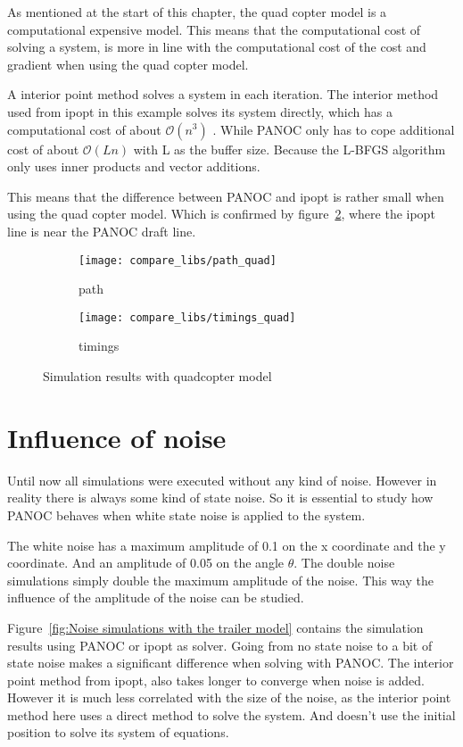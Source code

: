 As mentioned at the start of this chapter, the quad copter model is a computational expensive model. This means that the computational cost of solving a system, is more in line with the computational cost of the cost and gradient when using the quad copter model.

A interior point method solves a system in each iteration. The interior method used from ipopt in this example solves its system directly, which has a computational cost of about $\mathcal{O}(n^3)$ . While PANOC only has to cope additional cost of about $\mathcal{O}(Ln)$ with L as the buffer size.  Because the L-BFGS algorithm only uses inner products and vector additions.

This means that the difference between PANOC and ipopt is rather small when using the quad copter model. Which is confirmed by figure~\ref{fig:timings trailer quad}, where the ipopt line is near the PANOC draft line.
\begin{figure}[H]
	\centering
	\begin{subfigure}[b]{0.45\textwidth}
		\centering
		\texttt{[image: compare\_libs/path\_quad]}
		\caption{path}
		\label{fig:solution path trailer quad}
	\end{subfigure}
	\hfill
	\begin{subfigure}[b]{0.45\textwidth}
		\centering
		\texttt{[image: compare\_libs/timings\_quad]}
		\caption{timings}
		\label{fig:timings trailer quad}
	\end{subfigure}
	\caption{Simulation results with quadcopter model}
	\label{fig:Simulation results with quadcopter}
\end{figure}

\section{Influence of noise}
Until now all simulations were executed without any kind of noise. However in reality there is always some kind of state noise. So it is essential to study how PANOC behaves when white state noise is applied to the system.

The white noise has a maximum amplitude of 0.1 on the x coordinate and the y coordinate. And an amplitude of 0.05 on the angle $\theta$. The double noise simulations simply double the maximum amplitude of the noise. This way the influence of the amplitude of the noise can be studied.

Figure~\ref{fig:Noise simulations with the trailer model} contains the simulation results using PANOC or ipopt as solver. Going from no state noise to a bit of state noise makes a significant difference when solving with PANOC. The interior point method from ipopt, also takes longer to converge when noise is added. However it is much less correlated with the size of the noise, as the interior point method here uses a direct method to solve the system. And doesn't use the initial position to solve its system of equations. 

